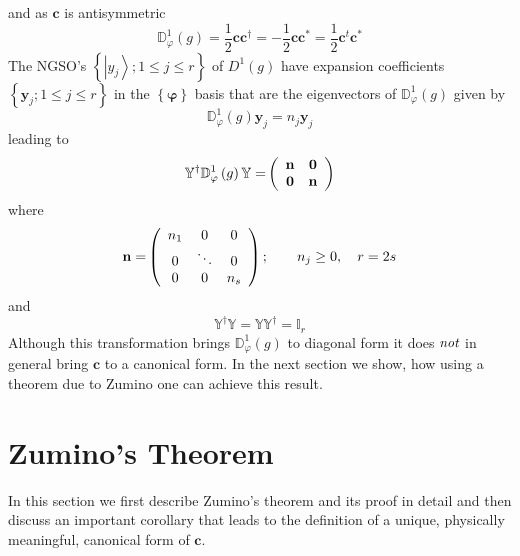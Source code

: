 \documentclass[aps,preprint]{revtex4}%
\begin{document}
and as $\mathbf{c}$ is antisymmetric
\begin{equation}
\mathbb{D}_{\varphi}^{1}\left(  g\right)  =\frac{1}{2}\mathbf{cc}^{\dagger
}=-\frac{1}{2}\mathbf{cc}^{\ast}=\frac{1}{2}\mathbf{c}^{t}\mathbf{c}^{\ast}%
\end{equation}
The NGSO's $\left\{  \left\vert y_{j}\right\rangle ;1\leq j\leq r\right\}  $
of $D^{1}\left(  g\right)  $ have expansion coefficients $\left\{
\mathbf{y}_{j};1\leq j\leq r\right\}  $ in the $\left\{  \mathbf{\varphi
}\right\}  $ basis that are the eigenvectors of $\mathbb{D}_{\varphi}%
^{1}\left(  g\right)  $ given by
\begin{equation}
\mathbb{D}_{\varphi}^{1}\left(  g\right)  \mathbf{y}_{j}=n_{j}\mathbf{y}_{j}%
\end{equation}
leading to
\begin{equation}
\mathbb{Y}^{\dagger}\mathbb{D}_{\varphi}^{1}\left(  g\right)  \mathbb{Y=}%
\left(
\begin{array}
[c]{cc}%
\mathbf{n} & \mathbf{0}\\
\mathbf{0} & \mathbf{n}%
\end{array}
\right)
\end{equation}
where
\begin{equation}
\mathbf{n=}\left(
\begin{array}
[c]{ccc}%
n_{1} & 0 & 0\\
0 & \ddots & 0\\
0 & 0 & n_{s}%
\end{array}
\right)  ;\qquad n_{j}\geq0,\quad r=2s
\end{equation}
and
\begin{equation}
\mathbb{Y}^{\dagger}\mathbb{Y}=\mathbb{YY}^{\dagger}=\mathbb{I}_{r}%
\end{equation}
Although this transformation brings $\mathbb{D}_{\varphi}^{1}\left(  g\right)
$ to diagonal form it does $\emph{not}$ in general bring $\mathbf{c}$ to a
canonical form. In the next section we show, how using a theorem due to Zumino
\cite{Zumino62} one can achieve this result.

\section{Zumino's Theorem\label{zumino}}

In this section we first describe Zumino's theorem and its proof in detail and
then discuss an important corollary that leads to the definition of a unique,
physically meaningful, canonical form of $\mathbf{c.}$
\end{document}
